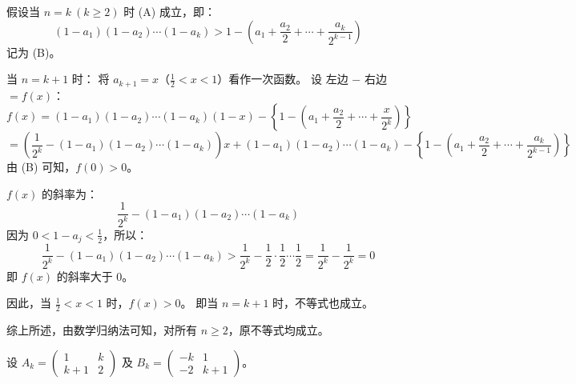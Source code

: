 \begin{questions}
\begin{solution}
假设当 $n = k \ (k \ge 2)$ 时 (A) 成立，即：
\[
(1-a_1)(1-a_2)\cdots(1-a_k) > 1 - \left(a_1 + \frac{a_2}{2} + \cdots + \frac{a_k}{2^{k-1}}\right)
\]
记为 (B)。

当 $n = k + 1$ 时：
将 $a_{k+1} = x$（$\frac{1}{2} < x < 1$）看作一次函数。
设 左边 $-$ 右边 $= f(x)$：
\[
f(x) = (1-a_1)(1-a_2)\cdots(1-a_k)(1-x) - \left\{ 1 - \left(a_1 + \frac{a_2}{2} + \cdots + \frac{x}{2^k}\right) \right\}
\]
\[
= \left( \frac{1}{2^k} - (1-a_1)(1-a_2)\cdots(1-a_k) \right) x + (1-a_1)(1-a_2)\cdots(1-a_k) - \left\{ 1 - \left(a_1 + \frac{a_2}{2} + \cdots + \frac{a_k}{2^{k-1}}\right) \right\}
\]
由 (B) 可知，$f(0) > 0$。

$f(x)$ 的斜率为：
\[
\frac{1}{2^k} - (1-a_1)(1-a_2)\cdots(1-a_k)
\]
因为 $0 < 1 - a_j < \frac{1}{2}$，所以：
\[
\frac{1}{2^k} - (1-a_1)(1-a_2)\cdots(1-a_k) > \frac{1}{2^k} - \frac{1}{2} \cdot \frac{1}{2} \cdots \frac{1}{2} = \frac{1}{2^k} - \frac{1}{2^k} = 0
\]
即 $f(x)$ 的斜率大于 $0$。

因此，当 $\frac{1}{2} < x < 1$ 时，$f(x) > 0$。
即当 $n = k + 1$ 时，不等式也成立。

综上所述，由数学归纳法可知，对所有 $n \ge 2$，原不等式均成立。
\end{solution}

\question 设 $A_k = \begin{pmatrix} 1 & k \\ k+1 & 2 \end{pmatrix}$ 及 $B_k = \begin{pmatrix} -k & 1 \\ -2 & k+1 \end{pmatrix}$。
\end{questions}
